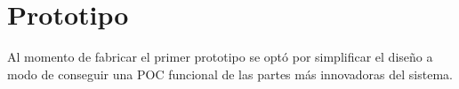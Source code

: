 \chapter{Prototipo}

\label{Chapter:Prototipo} 
Al momento de fabricar el primer prototipo se optó por simplificar el diseño a modo de conseguir una POC funcional de las partes más innovadoras del sistema.






%